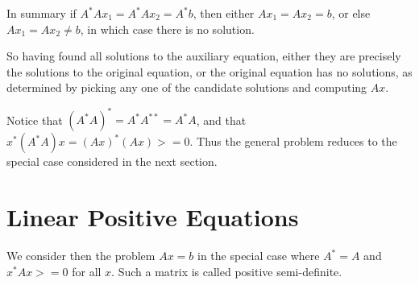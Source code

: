 \documentclass{article}
\begin{document}
In summary if \begin{math}{}A^*Ax_1 = A^*Ax_2 = A^*b \end{math}, then either \begin{math}{}Ax_1 = Ax_2 = b \end{math}, or else \begin{math}{}Ax_1 = Ax_2 \ne b \end{math}, in which case there is no solution. 

So having found all solutions to the auxiliary equation, either they are precisely the solutions to the original equation, or the original equation has no solutions, as determined by picking any one of the candidate solutions and computing \begin{math}{}Ax\end{math}.

Notice that \begin{math}{}(A^*A)^* = A^*A^{**} = A^*A\end{math}, and that \begin{math}{}x^*(A^*A)x=(Ax)^*(Ax) >= 0\end{math}. Thus the general problem reduces to the special case considered in the next section.

\section{Linear Positive Equations}

We consider then the problem \begin{math}{}Ax=b\end{math} in the special case where
\begin{math}{}A^*=A\end{math} and \begin{math}{}x^*Ax >= 0\end{math} for all \begin{math}{}x\end{math}. Such a matrix is called positive semi-definite.
\end{document}
